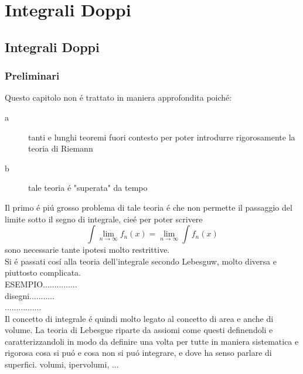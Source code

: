 \part{Integrali Doppi}
\chapter{Integrali Doppi}
\section{Preliminari}
Questo capitolo non \'e trattato in maniera approfondita poich\'e:
\begin{description}
	\item[a] tanti e lunghi teoremi fuori contesto per poter introdurre rigorosamente la teoria di Riemann
	\item[b] tale teoria \'e "superata" da tempo
\end{description}
Il primo \'e pi\'u grosso problema di tale teoria \'e che non permette il passaggio del limite sotto il segno di integrale, cie\'e per poter scrivere 
$$ \int\lim\limits_{n\to\infty}f_n(x) = \lim\limits_{n\to\infty}\int f_n(x)$$ sono necessarie tante ipotesi molto restrittive.\\
Si \'e passati cos\'i alla teoria dell'integrale secondo Lebesguw, molto diversa e piuttosto complicata.\\
ESEMPIO...............\\
disegni...........\\
................\\
Il concetto di integrale \'e quindi molto legato al concetto di area e anche di volume. La teoria di Lebesgue riparte da assiomi come questi definendoli e caratterizzandoli in modo da definire una volta per tutte in maniera sistematica e rigorosa cosa si pu\'o e cosa non si pu\'o integrare, e dove ha senso parlare di superfici. volumi, ipervolumi, ... 
